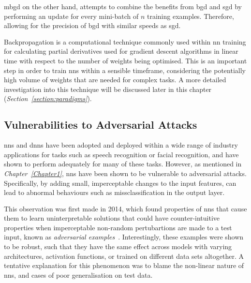 \gls{mbgd} on the other hand, attempts to combine the benefits from \gls{bgd} and \gls{sgd} by 
performing an update for every mini-batch of $n$ training examples. Therefore, allowing for the precision of
\gls{bgd} with similar speeds as \gls{sgd}.

Backpropagation is a computational technique commonly used within \gls{nn} training for calculating
partial derivatives used for gradient descent algorithms in linear time with respect 
to the number of weights being optimised. This is an important
step in order to train \glspl{nn} within a sensible timeframe, considering the potentially
high volume of weights that are needed for complex tasks. A more detailed 
investigation into this technique will be discussed later in this chapter (\textit{Section~\ref{section:paradigms}}).

\subsection{Vulnerabilities to Adversarial Attacks}\label{section:adversarial}

\glspl{nn} and \glspl{dnn} have been adopted and deployed within a wide
range of industry applications for tasks such as speech recognition or facial recognition, 
and have shown to perform adequately for many of these tasks. However, as mentioned in \textit{Chapter~\ref{Chapter1}}, \glspl{nn} have been shown to be
vulnerable to adversarial attacks. Specifically, by adding small, imperceptable changes
to the input features, can lead to abnormal behaviours such as missclassification in the output layer.

This observation was first made in 2014,
which found properties of \glspl{nn} that cause them to learn uninterpretable solutions that could have counter-intuitive properties when
imperceptable non-random pertubartions are made to a test input, known as \textit{adversarial examples}~\citep{szegedy2014}. 
Interestingly, these examples were shown to be robust, such that they have the same effect
across models with varying architectures, activation functions, or trained on different data sets altogether. A tentative
explanation for this phenomenon was to blame the non-linear nature of \glspl{nn}, and cases of poor generalisation on test data.


